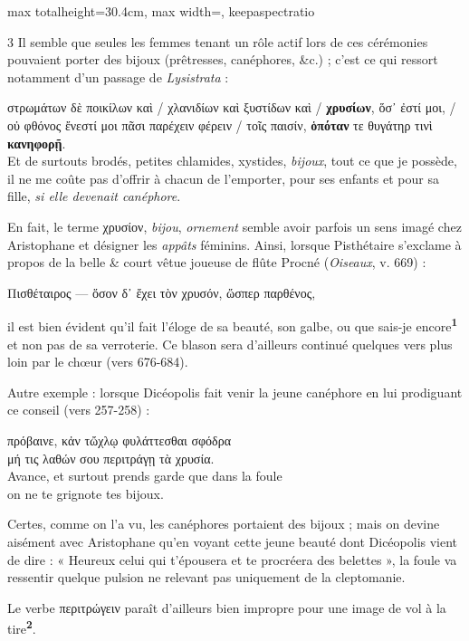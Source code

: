 \documentclass[11pt,twoside]{book}
\newcommand{\italique}[1]{\textit{#1}}
\newcommand{\citComm}[1]{\begin{quoting}[vskip=0.4pt,leftmargin=0.7em,rightmargin=0.2em]#1\end{quoting}}
\newcommand{\francais}[1]{{\policeFr #1}}
\newcommand{\marqueur}[1]{\textsuperscript{\color{rubricRed}\textbf{#1}}}
\begin{document}
\begin{adjustbox}{max totalheight=30.4cm, max width=\textwidth, keepaspectratio}
\begin{minipage}{\textwidth}
{\begin{multicols}{3}
\noindent Il semble que seules les femmes tenant un rôle actif lors de ces cérémonies pouvaient porter des bijoux (prêtresses, canéphores, \&c.) ; c'est ce qui ressort notamment d'un passage de \italique{Lysistrata} :
\citComm{στρωμάτων δὲ ποικίλων καὶ /
χλανιδίων καὶ ξυστίδων καὶ /
\textbf{χρυσίων}, ὅσ᾽ ἐστί μοι, /
οὐ φθόνος ἔνεστί μοι πᾶσι παρέχειν φέρειν /
τοῖς παισίν, \textbf{ὁπόταν} τε θυγάτηρ τινὶ \textbf{κανηφορῇ}. \\
Et de surtouts brodés, petites chlamides, xystides, \italique{bijoux}, tout ce que je possède, il ne me coûte pas d'offrir à chacun de l'emporter, pour ses enfants et pour sa fille, \italique{si elle devenait canéphore}.}
\par\vspace{1.5pt}
\noindent En fait, le terme χρυσίον, \italique{bijou}, \italique{ornement} semble avoir parfois un sens imagé chez Aristophane et désigner les \italique{appâts} féminins. Ainsi, lorsque Pisthétaire s'exclame à propos de la belle \& court vêtue joueuse de flûte Procné (\italique{Oiseaux}, v. 669) :
\citComm{Πισθέταιρος --- ὅσον δ᾽ ἔχει τὸν χρυσόν, ὥσπερ παρθένος,}
\par\vspace{1.5pt}
\noindent il est bien évident qu'il fait l'éloge de sa beauté, son galbe, ou que sais-je encore\marqueur{1} et non pas de sa verroterie. Ce blason sera d'ailleurs continué quelques vers plus loin par le chœur (vers 676-684).
\par\vspace{1.5pt}
\noindent Autre exemple : lorsque Dicéopolis fait venir la jeune canéphore en lui prodiguant ce conseil (vers 257-258) :
\citComm{πρόβαινε, κἀν τὤχλῳ φυλάττεσθαι σφόδρα\\
μή τις λαθών σου περιτράγῃ τὰ χρυσία.\\
\francais{Avance, et surtout prends garde que dans la foule\\
on ne te grignote tes bijoux.}}
\par\vspace{1.5pt}
\noindent Certes, comme on l'a vu, les canéphores portaient des bijoux ; mais on devine aisément avec Aristophane qu'en voyant cette jeune beauté dont Dicéopolis vient de dire : « Heureux celui qui t'épousera et te procréera des belettes », la foule va ressentir quelque pulsion ne relevant pas uniquement de la cleptomanie.
\par\vspace{1.5pt}
\noindent Le verbe περιτρώγειν paraît d'ailleurs bien impropre pour une image de vol à la tire\marqueur{2}.

\end{multicols}}
\end{minipage}
\end{adjustbox}
\end{document}
